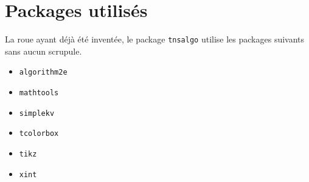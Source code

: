 \documentclass[12pt,a4paper]{article}
\begin{document}
\section{Packages utilisés}

La roue ayant déjà été inventée, le package \verb#tnsalgo# utilise les packages suivants sans aucun scrupule.

\begin{multicols}{4}
    \begin{itemize}
        \item \verb#algorithm2e#
        \item \verb#mathtools#
        \item \verb#simplekv#
        \item \verb#tcolorbox#
        \item \verb#tikz#
        \item \verb#xint#
    \end{itemize}
\end{multicols}
\end{document}
